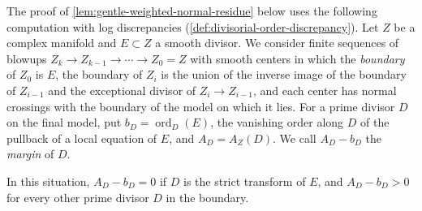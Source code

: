 The proof of \cref{lem:gentle-weighted-normal-residue} below uses the following computation with log discrepancies (\cref{def:divisorial-order-discrepancy}). Let $Z$ be a complex manifold and $E\subset Z$ a smooth divisor. We consider finite sequences of blowups $Z_k\to Z_{k-1}\to\cdots\to Z_0=Z$ with smooth centers in which the \emph{boundary} of $Z_0$ is $E$, the boundary of $Z_i$ is the union of the inverse image of the boundary of $Z_{i-1}$ and the exceptional divisor of $Z_i\to Z_{i-1}$, and each center has normal crossings with the boundary of the model on which it lies. For a prime divisor $D$ on the final model, put $b_D=\operatorname{ord}_D(E)$, the vanishing order along $D$ of the pullback of a local equation of $E$, and $A_D=A_Z(D)$. We call $A_D-b_D$ the \emph{margin} of $D$.

\begin{lemma}\label{lem:smooth-divisor-discrepancy-margin}
In this situation, $A_D-b_D=0$ if $D$ is the strict transform of $E$, and $A_D-b_D>0$ for every other prime divisor $D$ in the boundary.
\end{lemma}
